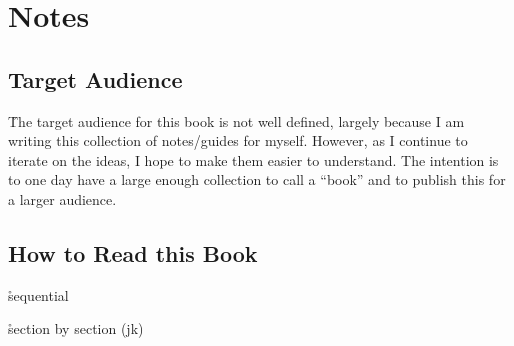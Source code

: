 \section{Notes}

\subsection{Target Audience}

\r{The target audience for this book is not well defined, largely because I am writing this collection of notes/guides for myself. However, as I continue to iterate on the ideas, I hope to make them easier to understand. The intention is to one day have a large enough collection to call a ``book'' and to publish this for a larger audience.}

\subsection{How to Read this Book}
\r{sequential}

\r{section by section (jk)}



